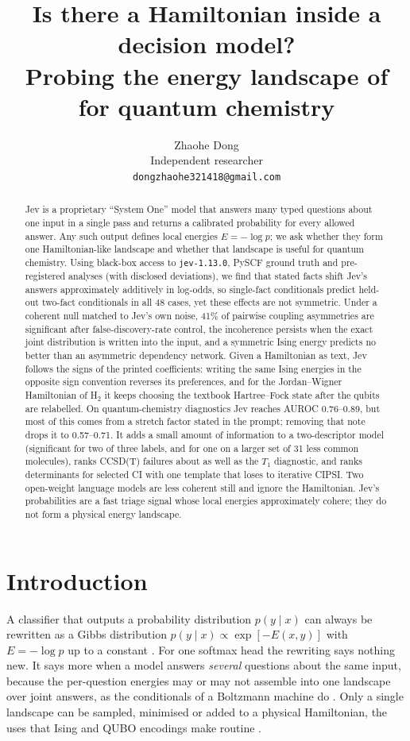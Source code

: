\documentclass[11pt]{article}
\title{Is there a Hamiltonian inside a decision model?\\ Probing the energy landscape of \jev{} for quantum chemistry}
\author{Zhaohe Dong\\ Independent researcher\\ \texttt{dongzhaohe321418@gmail.com}}
\date{}
\newcommand{\jev}{Jev}
\begin{document}
\maketitle

\begin{abstract}
\jev{} is a proprietary ``System One'' model that answers many typed questions about one input in a single pass and returns a calibrated probability for every allowed answer.
Any such output defines local energies $E=-\log p$; we ask whether they form one Hamiltonian-like landscape and whether that landscape is useful for quantum chemistry.
Using black-box access to \texttt{jev-1.13.0}, PySCF ground truth and pre-registered analyses (with disclosed deviations), we find that stated facts shift \jev{}'s answers approximately additively in log-odds, so single-fact conditionals predict held-out two-fact conditionals in all 48 cases, yet these effects are not symmetric.
Under a coherent null matched to \jev{}'s own noise, 41\% of pairwise coupling asymmetries are significant after false-discovery-rate control, the incoherence persists when the exact joint distribution is written into the input, and a symmetric Ising energy predicts no better than an asymmetric dependency network.
Given a Hamiltonian as text, \jev{} follows the signs of the printed coefficients: writing the same Ising energies in the opposite sign convention reverses its preferences, and for the Jordan--Wigner Hamiltonian of H$_2$ it keeps choosing the textbook Hartree--Fock state after the qubits are relabelled.
On quantum-chemistry diagnostics \jev{} reaches AUROC 0.76--0.89, but most of this comes from a stretch factor stated in the prompt; removing that note drops it to 0.57--0.71.
It adds a small amount of information to a two-descriptor model (significant for two of three labels, and for one on a larger set of 31 less common molecules), ranks CCSD(T) failures about as well as the $T_1$ diagnostic, and ranks determinants for selected CI with one template that loses to iterative CIPSI.
Two open-weight language models are less coherent still and ignore the Hamiltonian.
\jev{}'s probabilities are a fast triage signal whose local energies approximately cohere; they do not form a physical energy landscape.
\end{abstract}

\section{Introduction}

A classifier that outputs a probability distribution $p(y\mid x)$ can always be rewritten as a Gibbs distribution $p(y\mid x)\propto \exp[-E(x,y)]$ with $E=-\log p$ up to a constant \citep{lecun2006tutorial,grathwohl2019your}.
For one softmax head the rewriting says nothing new.
It says more when a model answers \emph{several} questions about the same input, because the per-question energies may or may not assemble into one landscape over joint answers, as the conditionals of a Boltzmann machine do \citep{ackley1985learning}.
Only a single landscape can be sampled, minimised or added to a physical Hamiltonian, the uses that Ising and QUBO encodings make routine \citep{lucas2014ising,kadowaki1998quantum}.
\end{document}
